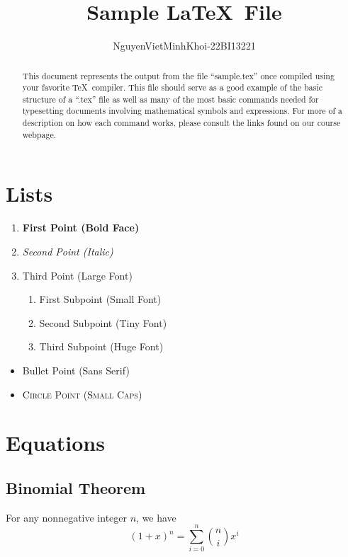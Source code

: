 \documentclass[12pt]{article}
\begin{document}
\title{Sample \LaTeX\ File}
\author{NguyenVietMinhKhoi-22BI13221}
\maketitle

\begin{abstract}
This document represents the output from the file ``sample.tex'' once compiled using your favorite \TeX\ compiler. This file should serve as a good example of the basic structure of a ``.tex'' file as well as many of the most basic commands needed for typesetting documents involving mathematical symbols and expressions. For more of a description on how each command works, please consult the links found on our course webpage.
\end{abstract}

\section{Lists}
\begin{enumerate}
    \item \textbf{First Point (Bold Face)}
    \item \textit{Second Point (Italic)}
    \item \Huge Third Point (Large Font)
    \begin{enumerate}
        \item \small First Subpoint (Small Font)
        \item \tiny Second Subpoint (Tiny Font)
        \item \Huge Third Subpoint (Huge Font)
    \end{enumerate}
\end{enumerate}
\begin{itemize}
    \item \textsf{Bullet Point (Sans Serif)}
    \item \textsc{Circle Point (Small Caps)}
\end{itemize}

\section{Equations}

\subsection{Binomial Theorem}
\begin{theorem}
For any nonnegative integer $n$, we have
\[
(1+x)^n = \sum_{i=0}^n \binom{n}{i} x^i
\]
\end{theorem}
\end{document}
